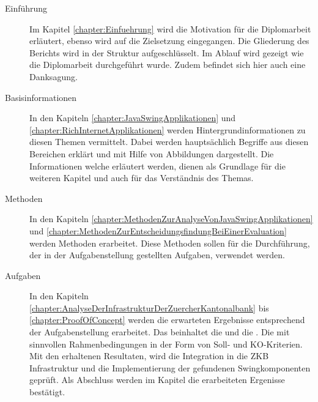   \begin{description}
    
  \item[Einführung]
  
  Im Kapitel \ref{chapter:Einfuehrung}  wird die
  Motivation für die Diplomarbeit erläutert, ebenso wird auf die Zielsetzung
  eingegangen. Die Gliederung des Berichts wird in der Struktur
  aufgeschlüsselt. Im Ablauf wird gezeigt wie die Diplomarbeit durchgeführt
  wurde. Zudem befindet sich hier auch eine Danksagung.
  
  \item[Basisinformationen]
    
  In den Kapiteln 
  \ref{chapter:JavaSwingApplikationen} 
  und \ref{chapter:RichInternetApplikationen}
   werden Hintergrundinformationen
  zu diesen Themen vermittelt. Dabei werden hauptsächlich Begriffe aus diesen
  Bereichen erklärt und mit Hilfe von Abbildungen dargestellt. Die
  Informationen welche erläutert werden, dienen als Grundlage für die weiteren
  Kapitel und auch für das Verständnis des Themas.

  \item[Methoden]
  
  In den Kapiteln
  \ref{chapter:MethodenZurAnalyseVonJavaSwingApplikationen}
   und
  \ref{chapter:MethodenZurEntscheidungsfindungBeiEinerEvaluation}
   werden
  Methoden erarbeitet. Diese Methoden sollen für die Durchführung, der in der
  Aufgabenstellung gestellten Aufgaben, verwendet werden.
  
  \item[Aufgaben]
  
  In den Kapiteln \ref{chapter:AnalyseDerInfrastrukturDerZuercherKantonalbank}
  bis \ref{chapter:ProofOfConcept} werden die erwarteten Ergebnisse
  entsprechend der Aufgabenstellung erarbeitet. Das beinhaltet die
   und die
  . Die
   mit sinnvollen
  Rahmenbedingungen in der Form von Soll- und KO-Kriterien. Mit den erhaltenen
  Resultaten, wird die Integration in die ZKB Infrastruktur und die
  Implementierung der gefundenen Swingkomponenten geprüft. Als Abschluss werden
  im Kapitel  die erarbeiteten Ergenisse bestätigt.
  

\end{description}
